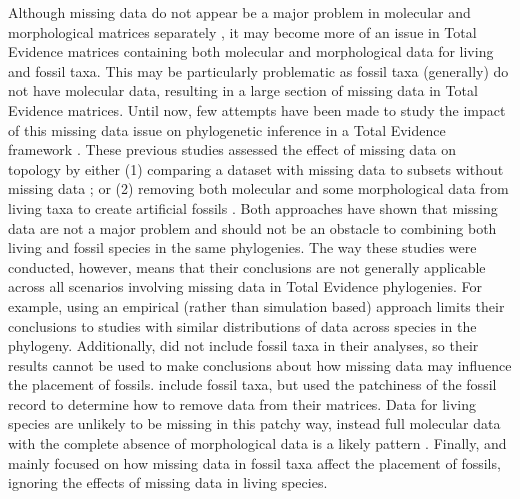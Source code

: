 Although missing data do not appear be a major problem in molecular and morphological matrices separately \citep[as long as enough data overlaps in each case, and missing data are not phylogeneticaly biased;][]{wiensmissing2003,Wiens01102005,wiensmissing2006,wiensmissing2008,lemmonthe2009,Sanderson22072011,rouresite-specific2011,pattinsonphylogeny2014}, it may become more of an issue in Total Evidence matrices containing both molecular and morphological data for living and fossil taxa.
This may be particularly problematic as fossil taxa (generally) do not have molecular data, resulting in a large section of missing data in Total Evidence matrices.
Until now, few attempts have been made to study the impact of this missing data issue on phylogenetic inference in a Total Evidence framework \citep[i.e. using both molecular and morphological data;][]{Wiens01102005,manosphylogeny2007,pattinsonphylogeny2014}.
These previous studies assessed the effect of missing data on topology by either (1) comparing a dataset with missing data to subsets without missing data \citep{Wiens01102005}; or (2) removing both molecular and some morphological data from living taxa to create artificial fossils \citep{manosphylogeny2007,pattinsonphylogeny2014}.
Both approaches have shown that missing data are not a major problem and should not be an obstacle to combining both living and fossil species in the same phylogenies.
The way these studies were conducted, however, means that their conclusions are not generally applicable across all scenarios involving missing data in Total Evidence phylogenies.
For example, using an empirical (rather than simulation based) approach limits their conclusions to studies with similar distributions of data across species in the phylogeny.
Additionally, \cite{Wiens01102005} did not include fossil taxa in their analyses, so their results cannot be used to make conclusions about how missing data may influence the placement of fossils.
\cite{manosphylogeny2007,pattinsonphylogeny2014} include fossil taxa, but used the patchiness of the fossil record to determine how to remove data from their matrices. 
Data for living species are unlikely to be missing in this patchy way, instead full molecular data with the complete absence of morphological data is a likely pattern \citep{GuillermeCooperMissing}.
Finally, \cite{manosphylogeny2007} and \cite{pattinsonphylogeny2014} mainly focused on how missing data in fossil taxa affect the placement of fossils, ignoring the effects of missing data in living species.


